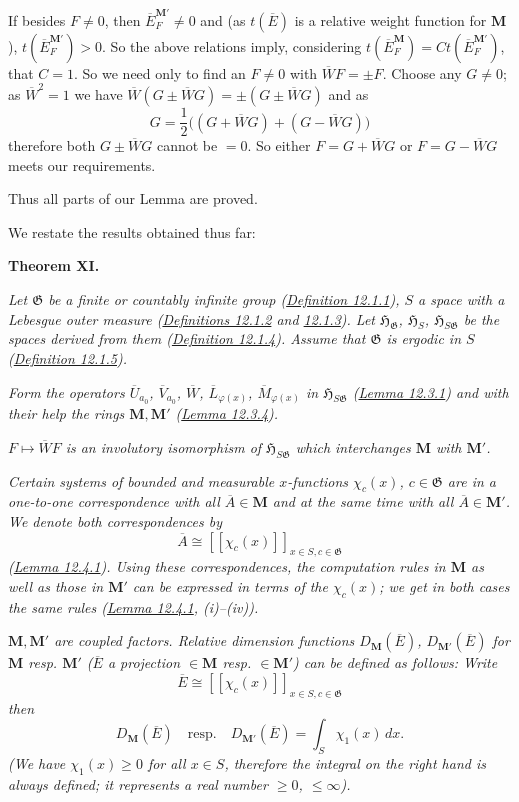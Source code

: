 \documentclass[12pt,b5paper,twoside]{article}
\newcommand{\Hspace}{\mathfrak H}
\newcommand{\M}{\mathbf M}
\newcommand{\MainTheorem}[1]{%
  \par\smallskip\noindent\phantomsection\label{thm:#1}\textbf{Theorem #1.}\enspace
}
\newcommand{\defref}[1]{\hyperref[def:#1]{Definition #1}}
\newcommand{\lemref}[1]{\hyperref[lem:#1]{Lemma #1}}
\begin{document}
If besides $F\neq0$, then $\overline E_F^{\M'}\neq0$ and (as
$t(\overline E)$ is a relative weight function for $\M$),
$t(\overline E_F^{\M'})>0$. So the above relations imply, considering
$t(\overline E_F^{\M})=Ct(\overline E_F^{\M'})$, that $C=1$. So we need only
to find an $F\neq0$ with $\overline WF=\pm F$. Choose any $G\neq0$; as
$\overline W^2=1$ we have
$\overline W(G\pm\overline WG)=\pm(G\pm\overline WG)$ and as
\[
 G=\frac12\bigl((G+\overline WG)+(G-\overline WG)\bigr)
\]
therefore both $G\pm\overline WG$ cannot be $=0$. So either
$F=G+\overline WG$ or $F=G-\overline WG$ meets our requirements.

Thus all parts of our Lemma are proved.

We restate the results obtained thus far:

\MainTheorem{XI}
\emph{Let $\mathfrak G$ be a finite or countably infinite group
(\defref{12.1.1}), $S$ a space with a Lebesgue outer measure
(\hyperref[def:12.1.2]{Definitions 12.1.2} and
\hyperref[def:12.1.3]{12.1.3}). Let
$\Hspace_{\mathfrak G}$, $\Hspace_S$, $\Hspace_{S\mathfrak G}$ be the spaces
derived from them (\defref{12.1.4}). Assume that $\mathfrak G$ is ergodic in
$S$ (\defref{12.1.5}).}

\emph{Form the operators $\overline U_{a_0}$, $\overline V_{a_0}$,
$\overline W$, $\overline L_{\varphi(x)}$, $\overline M_{\varphi(x)}$ in
$\Hspace_{S\mathfrak G}$ (\lemref{12.3.1}) and with their help the rings
$\M,\M'$ (\lemref{12.3.4}).}

\emph{$F\mapsto\overline WF$ is an involutory isomorphism of
$\Hspace_{S\mathfrak G}$ which interchanges $\M$ with $\M'$.}

\emph{Certain systems of bounded and measurable $x$-functions $\chi_c(x)$,
$c\in\mathfrak G$ are in a one-to-one correspondence with all
$\overline A\in\M$ and at the same time with all $\overline A\in\M'$. We
denote both correspondences by}
\[
 \overline A\cong[[\chi_c(x)]]_{x\in S,c\in\mathfrak G}
\]
\emph{(\lemref{12.4.1}). Using these correspondences, the computation rules in
$\M$ as well as those in $\M'$ can be expressed in terms of the $\chi_c(x)$;
we get in both cases the same rules (\lemref{12.4.1}, (i)--(iv)).}

\emph{$\M,\M'$ are coupled factors. Relative dimension functions
$D_\M(\overline E)$, $D_{\M'}(\overline E)$ for $\M$ resp. $\M'$ ($\overline
E$ a projection $\in\M$ resp. $\in\M'$) can be defined as follows: Write}
\[
 \overline E\cong[[\chi_c(x)]]_{x\in S,c\in\mathfrak G}
\]
\emph{then}
\[
 D_\M(\overline E)\quad\text{resp.}\quad D_{\M'}(\overline E)
 =\int_S\chi_1(x)\,dx.
\]
\emph{(We have $\chi_1(x)\geq0$ for all $x\in S$, therefore the integral on
the right hand is always defined; it represents a real number
$\geq0$, $\leq\infty$).}
\end{document}

